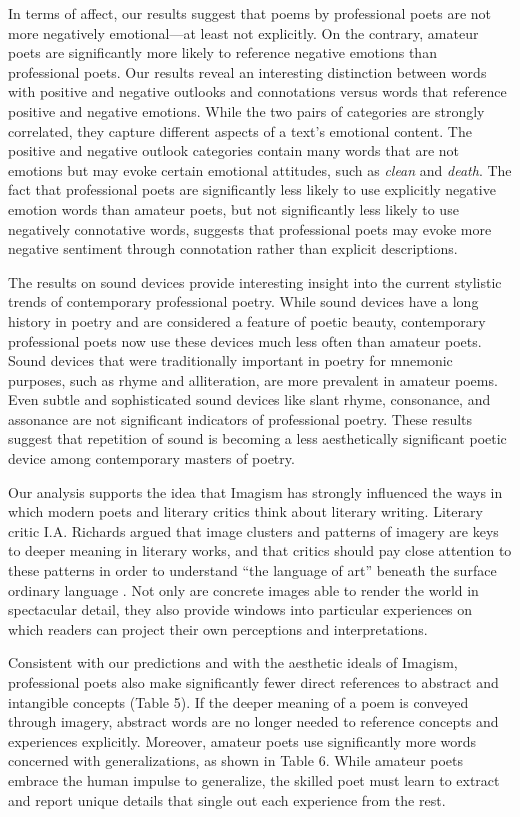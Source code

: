 \documentclass{book}
\begin{document}
In terms of affect, our results suggest that poems by professional poets are not more negatively emotional---at least not explicitly. On the contrary, amateur poets are significantly more likely to reference negative emotions than professional poets. Our results reveal an interesting distinction between words with positive and negative outlooks and connotations versus words that reference positive and negative emotions. While the two pairs of categories are strongly correlated, they capture different aspects of a text's emotional content. The positive and negative outlook categories contain many words that are not emotions but may evoke certain emotional attitudes, such as \emph{clean} and \emph{death}. The fact that professional poets are significantly less likely to use explicitly negative emotion words than amateur poets, but not significantly less likely to use negatively connotative words, suggests that professional poets may evoke more negative sentiment through connotation rather than explicit descriptions.

The results on sound devices provide interesting insight into the current stylistic trends of contemporary professional poetry. While sound devices have a long history in poetry and are considered a feature of poetic beauty, contemporary professional poets now use these devices much less often than amateur poets. Sound devices that were traditionally important in poetry for mnemonic purposes, such as rhyme and alliteration, are more prevalent in amateur poems. Even subtle and sophisticated sound devices like slant rhyme, consonance, and assonance are not significant indicators of professional poetry. These results suggest that repetition of sound is becoming a less aesthetically significant poetic device among contemporary masters of poetry.

Our analysis supports the idea that Imagism has strongly influenced the ways in which modern poets and literary critics think about literary writing. Literary critic I.A. Richards argued that image clusters and patterns of imagery are keys to deeper meaning in literary works, and that critics should pay close attention to these patterns in order to understand ``the language of art'' beneath the surface ordinary language \citep{critic}. Not only are concrete images able to render the world in spectacular detail, they also provide windows into particular experiences on which readers can project their own perceptions and interpretations.

Consistent with our predictions and with the aesthetic ideals of Imagism, professional poets also make significantly fewer direct references to abstract and intangible concepts (Table 5). If the deeper meaning of a poem is conveyed through imagery, abstract words are no longer needed to reference concepts and experiences explicitly. Moreover, amateur poets use significantly more words concerned with generalizations, as shown in Table 6. While amateur poets embrace the human impulse to generalize, the skilled poet must learn to extract and report unique details that single out each experience from the rest. 
\end{document}
